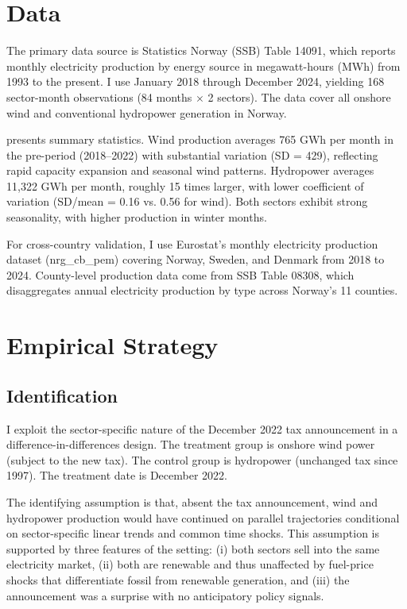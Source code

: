 \documentclass[12pt]{article}
\begin{document}
\section{Data}
\label{sec:data}

The primary data source is Statistics Norway (SSB) Table 14091, which reports monthly electricity production by energy source in megawatt-hours (MWh) from 1993 to the present. I use January 2018 through December 2024, yielding 168 sector-month observations (84 months $\times$ 2 sectors). The data cover all onshore wind and conventional hydropower generation in Norway.



 presents summary statistics. Wind production averages 765 GWh per month in the pre-period (2018--2022) with substantial variation (SD = 429), reflecting rapid capacity expansion and seasonal wind patterns. Hydropower averages 11,322 GWh per month, roughly 15 times larger, with lower coefficient of variation (SD/mean = 0.16 vs. 0.56 for wind). Both sectors exhibit strong seasonality, with higher production in winter months.

For cross-country validation, I use Eurostat's monthly electricity production dataset (nrg\_cb\_pem) covering Norway, Sweden, and Denmark from 2018 to 2024. County-level production data come from SSB Table 08308, which disaggregates annual electricity production by type across Norway's 11 counties.


\section{Empirical Strategy}
\label{sec:strategy}

\subsection{Identification}

I exploit the sector-specific nature of the December 2022 tax announcement in a difference-in-differences design. The treatment group is onshore wind power (subject to the new tax). The control group is hydropower (unchanged tax since 1997). The treatment date is December 2022.

The identifying assumption is that, absent the tax announcement, wind and hydropower production would have continued on parallel trajectories conditional on sector-specific linear trends and common time shocks. This assumption is supported by three features of the setting: (i) both sectors sell into the same electricity market, (ii) both are renewable and thus unaffected by fuel-price shocks that differentiate fossil from renewable generation, and (iii) the announcement was a surprise with no anticipatory policy signals.
\end{document}
